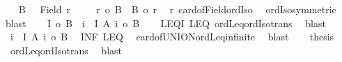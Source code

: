 \begin{isabellebody}
%
\isadelimproof
%
\endisadelimproof
%
\isatagproof
{}\isamarkupfalse%
{\isacharminus}{\kern0pt}\isanewline
\ \ \isamarkupfalse%
\ {\isacharquery}{\kern0pt}B\ \ {\isacharequal}{\kern0pt}\ {\isachardoublequoteopen}Field\ r{\isachardoublequoteclose}\isanewline
\ \ \isamarkupfalse%
\ {}{\isacharcolon}{\kern0pt}\ {\isachardoublequoteopen}r\ {\isacharequal}{\kern0pt}o\ {\isacharbar}{\kern0pt}{\isacharquery}{\kern0pt}B{\isacharbar}{\kern0pt}\ {\isasymand}\ {\isacharbar}{\kern0pt}{\isacharquery}{\kern0pt}B{\isacharbar}{\kern0pt}\ {\isacharequal}{\kern0pt}o\ r{\isachardoublequoteclose}\ \isamarkupfalse%
\ r\ card{\isacharunderscore}{\kern0pt}of{\isacharunderscore}{\kern0pt}Field{\isacharunderscore}{\kern0pt}ordIso\isanewline
\ \ ordIso{\isacharunderscore}{\kern0pt}symmetric\ \isamarkupfalse%
\ blast\isanewline
\ \ \isamarkupfalse%
\ {\isachardoublequoteopen}{\isacharbar}{\kern0pt}I{\isacharbar}{\kern0pt}\ {\isasymle}o\ {\isacharbar}{\kern0pt}{\isacharquery}{\kern0pt}B{\isacharbar}{\kern0pt}{\isachardoublequoteclose}\ \ {\isachardoublequoteopen}{\isasymforall}i\ {\isasymin}\ I{\isachardot}{\kern0pt}\ {\isacharbar}{\kern0pt}A\ i{\isacharbar}{\kern0pt}\ {\isasymle}o\ {\isacharbar}{\kern0pt}{\isacharquery}{\kern0pt}B{\isacharbar}{\kern0pt}{\isachardoublequoteclose}\isanewline
\ \ \isamarkupfalse%
\ LEQ{\isacharunderscore}{\kern0pt}I\ LEQ\ ordLeq{\isacharunderscore}{\kern0pt}ordIso{\isacharunderscore}{\kern0pt}trans\ \isamarkupfalse%
\ blast{\isacharplus}{\kern0pt}\isanewline
\ \ \isamarkupfalse%
\ \ {\isachardoublequoteopen}{\isacharbar}{\kern0pt}{\isasymUnion}i\ {\isasymin}\ I{\isachardot}{\kern0pt}\ A\ i{\isacharbar}{\kern0pt}\ {\isasymle}o\ {\isacharbar}{\kern0pt}{\isacharquery}{\kern0pt}B{\isacharbar}{\kern0pt}{\isachardoublequoteclose}\ \isamarkupfalse%
\ INF\ LEQ\isanewline
\ \ card{\isacharunderscore}{\kern0pt}of{\isacharunderscore}{\kern0pt}UNION{\isacharunderscore}{\kern0pt}ordLeq{\isacharunderscore}{\kern0pt}infinite\ \isamarkupfalse%
\ blast\isanewline
\ \ \isamarkupfalse%
\ {\isacharquery}{\kern0pt}thesis\ \isamarkupfalse%
\ {}\ ordLeq{\isacharunderscore}{\kern0pt}ordIso{\isacharunderscore}{\kern0pt}trans\ \isamarkupfalse%
\ blast\isanewline
{}\isamarkupfalse%
%
\endisatagproof
{\isafoldproof}%
%
\isadelimproof
\isanewline
%
\endisadelimproof
\isanewline
{}\isamarkupfalse%

\end{isabellebody}
